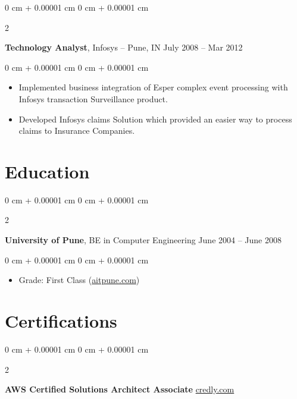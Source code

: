 \documentclass[10pt, letterpaper]{article}
\newenvironment{highlights}{
    \begin{itemize}[
        topsep=0.10 cm,
        parsep=0.10 cm,
        partopsep=0pt,
        itemsep=0pt,
        leftmargin=0 cm + 10pt
    ]
}{
    \end{itemize}
} %
\newenvironment{onecolentry}{
    \begin{adjustwidth}{
        0 cm + 0.00001 cm
    }{
        0 cm + 0.00001 cm
    }
}{
    \end{adjustwidth}
} %
\newenvironment{twocolentry}[2][]{
    \onecolentry
    \def\secondColumn{#2}
    \setcolumnwidth{\fill, 4.5 cm}
    \begin{paracol}{2}
}{
    \switchcolumn \raggedleft \secondColumn
    \end{paracol}
    \endonecolentry
} %
\begin{document}
        \begin{twocolentry}{
            July 2008 – Mar 2012
        }
            \textbf{Technology Analyst}, Infosys -- Pune, IN\end{twocolentry}

        \vspace{0.10 cm}
        
        \begin{onecolentry}
            \begin{highlights}
                \item Implemented business integration of Esper complex event processing with Infosys transaction Surveillance product.
                \item Developed Infosys claims Solution which provided an easier way to process claims to Insurance Companies.
            \end{highlights}
        \end{onecolentry}
        
    \section{Education}
    
        \begin{twocolentry}{
            June 2004 – June 2008
        }
            \textbf{University of Pune}, BE in Computer Engineering\end{twocolentry}

        \vspace{0.10 cm}
        \begin{onecolentry}
            \begin{highlights}
                \item Grade: First Class (\href{https://www.aitpune.com/}{aitpune.com})
            \end{highlights}
        \end{onecolentry}


    \section{Certifications}

        \begin{twocolentry}{
            \href{https://www.credly.com/badges/af2684bd-8520-451f-84c8-2675286b7cc}{credly.com}
        }
            \textbf{AWS Certified Solutions Architect Associate}\end{twocolentry}
\end{document}
